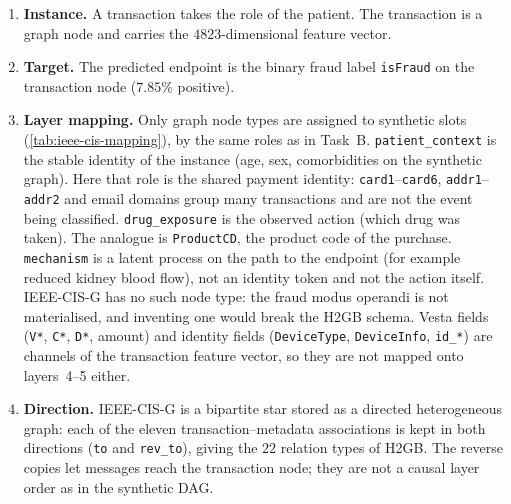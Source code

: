 \begin{enumerate}[label=(\roman*)]
  \item \textbf{Instance.} A transaction takes the role of the patient.
    The transaction is a graph node and
    carries the $4823$-dimensional feature vector.

  \item \textbf{Target.} The predicted endpoint is the binary fraud label
    \texttt{isFraud} on the transaction node ($7.85\%$ positive).

  \item \textbf{Layer mapping.} Only graph node types are assigned to synthetic
    slots (\cref{tab:ieee-cis-mapping}), by the same roles as in Task~B.
    \texttt{patient\_context} is the stable identity of the instance
    (age, sex, comorbidities on the synthetic graph).
    Here that role is the shared payment identity: \texttt{card1}--\texttt{card6},
    \texttt{addr1}--\texttt{addr2} and email domains group many transactions
    and are not the event being classified.
    \texttt{drug\_exposure} is the observed action (which drug was taken).
    The analogue is \texttt{ProductCD}, the product code of the purchase.
    \texttt{mechanism} is a latent process on the path to the endpoint
    (for example reduced kidney blood flow), not an identity token and not
    the action itself.
    IEEE-CIS-G has no such node type: the fraud modus operandi is not
    materialised, and inventing one would break the H2GB schema.
    Vesta fields (\texttt{V*}, \texttt{C*}, \texttt{D*}, amount) and identity
    fields (\texttt{DeviceType}, \texttt{DeviceInfo}, \texttt{id\_*}) are
    channels of the transaction feature vector, so they are not mapped onto
    layers~4--5 either.

  \item \textbf{Direction.} IEEE-CIS-G is a bipartite star stored as a directed
    heterogeneous graph: each of the eleven transaction--metadata associations
    is kept in both directions (\texttt{to} and \texttt{rev\_to}), giving the
    $22$ relation types of H2GB.
    The reverse copies let messages reach the transaction node; they are not a
    causal layer order as in the synthetic DAG.
\end{enumerate}

